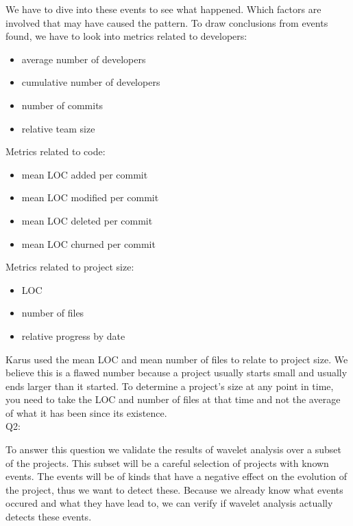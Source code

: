 We have to dive into these events to see what happened. Which factors are
involved that may have caused the pattern. To draw conclusions from events
found, we have to look into metrics related to developers:
\begin{itemize}
	\item average number of developers
	\item cumulative number of developers
	\item number of commits
	\item relative team size
\end{itemize}
Metrics related to code:
\begin{itemize}
	\item mean LOC added per commit
	\item mean LOC modified per commit
	\item mean LOC deleted per commit
	\item mean LOC churned per commit
\end{itemize}
Metrics related to project size:
\begin{itemize}
	\item LOC
	\item number of files
	\item relative progress by date
\end{itemize}

Karus used the mean LOC and mean number of files to relate to project size. We
believe this is a flawed number because a project usually starts small and
usually ends larger than it started. To determine a project's size at any point
in time, you need to take the LOC and number of files at that time and not the
average of what it has been since its existence.
\\

\noindent
Q2: \emph{\subQuestionTwo}

To answer this question we validate the results of wavelet analysis over a
subset of the projects. This subset will be a careful selection of projects with
known events. The events will be of kinds that have a negative effect on the
evolution of the project, thus we want to detect these. Because we already know
what events occured and what they have lead to, we can verify if wavelet
analysis actually detects these events.
